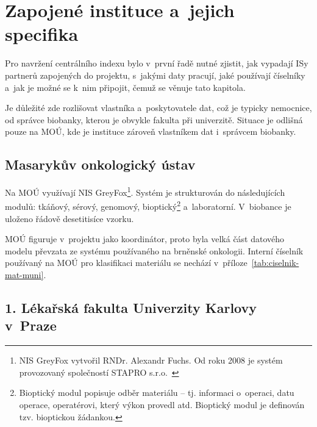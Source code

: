 \documentclass[11pt, final, oneside]{fithesis2}
\begin{document}
\section{Zapojené instituce a~jejich specifika}\label{sec:instituce}
Pro navržení centrálního indexu bylo v~první řadě nutné zjistit, jak vypadají ISy partnerů zapojených do projektu, s~jakými daty pracují, jaké používají číselníky a~jak je možné se k~nim připojit, čemuž se věnuje tato kapitola.

Je důležité zde rozlišovat vlastníka a~poskytovatele dat, což je typicky nemocnice, od správce biobanky, kterou je obvykle fakulta při univerzitě. Situace je odlišná pouze na MOÚ, kde je instituce zároveň vlastníkem dat i~správcem biobanky.

\subsection{Masarykův onkologický ústav}
Na MOÚ využívají NIS GreyFox\footnote{NIS GreyFox vytvořil RNDr. Alexandr Fuchs. Od roku 2008 je systém provozovaný společností STAPRO s.r.o.~\cite{GreyFox}}. Systém je strukturován do následujících modulů: tkáňový, sérový, genomový, bioptický\footnote{Bioptický modul popisuje odběr materiálu -- tj. informaci o~operaci, datu operace, operatérovi, který výkon provedl atd. Bioptický modul je definován tzv. bioptickou žádankou.} a~laboratorní. V~biobance je uloženo řádově desetitisíce vzorku.

MOÚ figuruje v~projektu jako koordinátor, proto byla velká část datového modelu převzata ze systému používaného na brněnské onkologii. Interní číselník používaný na MOÚ pro klasifikaci materiálu se nechází v~příloze~\ref{tab:ciselnik-mat-muni}.

\subsection{1. Lékařská fakulta Univerzity Karlovy v~Praze}
\end{document}
